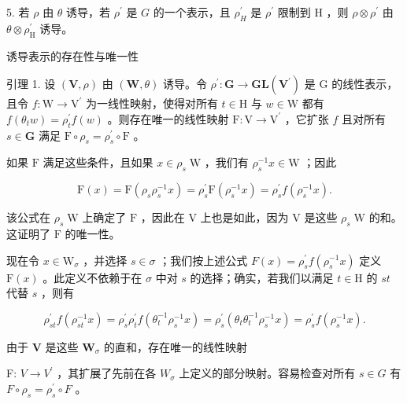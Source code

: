\documentclass[10pt]{article}
\begin{document}
5. 若 \(\rho\) 由 \(\theta\) 诱导，若 \({\rho }^{\prime }\) 是 \(G\) 的一个表示，且 \({\rho }_{H}^{\prime }\) 是 \({\rho }^{\prime }\) 限制到 \(\mathrm{H}\) ，则 \(\rho  \otimes  {\rho }^{\prime }\) 由 \(\theta  \otimes  {\rho }_{\mathrm{H}}^{\prime }\) 诱导。

诱导表示的存在性与唯一性

引理 1. 设 \(\left( {\mathbf{V},\rho }\right)\) 由 \(\left( {\mathbf{W},\theta }\right)\) 诱导。令 \({\rho }^{\prime } : \mathbf{G} \rightarrow  \mathbf{{GL}}\left( {\mathbf{V}}^{\prime }\right)\) 是 \(\mathrm{G}\) 的线性表示，且令 \(f : \mathrm{W} \rightarrow  {\mathrm{V}}^{\prime }\) 为一线性映射，使得对所有 \(t \in  \mathrm{H}\) 与 \(w \in  \mathrm{W}\) 都有 \(f\left( {{\theta }_{t}w}\right)  = {\rho }_{t}^{\prime }f\left( w\right)\) 。则存在唯一的线性映射 \(\mathrm{F} : \mathrm{V} \rightarrow  {\mathrm{V}}^{\prime }\) ，它扩张 \(f\) 且对所有 \(s \in  \mathbf{G}\) 满足 \(\mathrm{F} \circ  {\rho }_{s} = {\rho }_{s}^{\prime } \circ  \mathrm{F}\) 。

如果 \(\mathrm{F}\) 满足这些条件，且如果 \(x \in  {\rho }_{s}\mathrm{\;W}\) ，我们有 \({\rho }_{s}^{-1}x \in  \mathrm{W}\) ；因此

\[
\mathrm{F}\left( x\right)  = \mathrm{F}\left( {{\rho }_{s}{\rho }_{s}^{-1}x}\right)  = {\rho }_{s}^{\prime }\mathrm{F}\left( {{\rho }_{s}^{-1}x}\right)  = {\rho }_{s}^{\prime }f\left( {{\rho }_{s}^{-1}x}\right) .
\]

该公式在 \({\rho }_{s}\mathrm{\;W}\) 上确定了 \(\mathrm{F}\) ，因此在 \(\mathrm{V}\) 上也是如此，因为 \(\mathrm{V}\) 是这些 \({\rho }_{s}\mathrm{\;W}\) 的和。这证明了 \(\mathrm{F}\) 的唯一性。

现在令 \(x \in  {\mathrm{W}}_{\sigma }\) ，并选择 \(s \in  \sigma\) ；我们按上述公式 \(F\left( x\right)  = {\rho }_{s}^{\prime }f\left( {{\rho }_{s}^{-1}x}\right)\) 定义 \(\mathrm{F}\left( x\right)\) 。此定义不依赖于在 \(\sigma\) 中对 \(s\) 的选择；确实，若我们以满足 \(t \in  \mathrm{H}\) 的 \({st}\) 代替 \(s\) ，则有

\[
{\rho }_{st}^{\prime }f\left( {{\rho }_{st}^{-1}x}\right)  = {\rho }_{s}^{\prime }{\rho }_{t}^{\prime }f\left( {{\theta }_{t}^{-1}{\rho }_{s}^{-1}x}\right)  = {\rho }_{s}^{\prime }\left( {{\theta }_{t}{\theta }_{t}^{-1}{\rho }_{s}^{-1}x}\right)  = {\rho }_{s}^{\prime }f\left( {{\rho }_{s}^{-1}x}\right) .
\]

由于 \(\mathbf{V}\) 是这些 \({\mathbf{W}}_{\sigma }\) 的直和，存在唯一的线性映射

F: \(V \rightarrow  {V}^{\prime }\) ，其扩展了先前在各 \({W}_{\sigma }\) 上定义的部分映射。容易检查对所有 \(s \in  G\) 有 \(F \circ  {\rho }_{s} = {\rho }_{s}^{\prime } \circ  F\) 。
\end{document}
